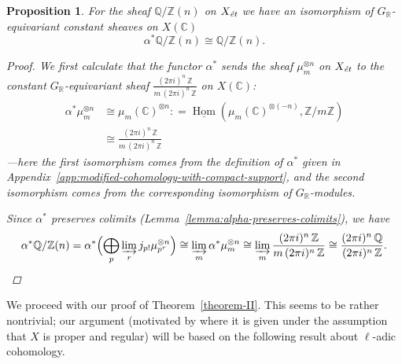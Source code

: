 \documentclass[leqno,12pt]{article}
\theoremstyle{plain}
\newtheorem{proposition}[theorem]{\indent\sc Proposition}
\theoremstyle{definition}
\DeclareMathOperator{\Hom}{Hom}
\newcommand{\CC}{\mathbb{C}}
\newcommand{\QQ}{\mathbb{Q}}
\newcommand{\RR}{\mathbb{R}}
\newcommand{\ZZ}{\mathbb{Z}}
\newcommand{\dfn}{\mathrel{\mathop:}=}
\newcommand{\et}{\text{\it \'{e}t}}
\newcommand{\iHom}{\underline{\Hom}}
\begin{document}
\begin{proposition}
  \label{propn:image-of-Q/Zn-under-alpha}
  For the sheaf $\QQ/\ZZ (n)$ on $X_\et$ we have an isomorphism of
  $G_\RR$-equivariant constant sheaves on $X (\CC)$
  $$\alpha^* \QQ/\ZZ (n) \cong \QQ/\ZZ (n).$$

  \begin{proof}
    We first calculate that the functor $\alpha^*$ sends the sheaf
    $\mu_m^{\otimes n}$ on $X_\et$ to the constant $G_\RR$-equivariant sheaf
    $\frac{(2\pi i)^n\,\ZZ}{m\,(2\pi i)^n\,\ZZ}$ on $X(\CC)$:
    \begin{align*}
      \alpha^* \mu_m^{\otimes n} & \cong \mu_m (\CC)^{\otimes n} \dfn \iHom (\mu_m (\CC)^{\otimes (-n)}, \ZZ/m\ZZ) \\
                                 & \cong \frac{(2\pi i)^n\,\ZZ}{m\,(2\pi i)^n\,\ZZ}
    \end{align*}
    ---here the first isomorphism comes from the definition of $\alpha^*$ given
    in Appendix~\ref{app:modified-cohomology-with-compact-support}, and the
    second isomorphism comes from the corresponding isomorphism of
    $G_\RR$-modules.

    Since $\alpha^*$ preserves colimits
    (Lemma~\ref{lemma:alpha-preserves-colimits}), we have
    \[
      \alpha^* \QQ/\ZZ (n)
      = \alpha^* \Bigl(\bigoplus_p \varinjlim_r j_{p!} \mu_{p^r}^{\otimes n}\Bigr)
      \cong \varinjlim_m \alpha^* \mu_m^{\otimes n}
      \cong \varinjlim_m \frac{(2\pi i)^n\,\ZZ}{m\,(2\pi i)^n\,\ZZ}
      \cong \frac{(2\pi i)^n\,\QQ}{(2\pi i)^n\,\ZZ}.
      \qedhere
    \]
  \end{proof}
\end{proposition}

We proceed with our proof of Theorem~\ref{theorem-II}. This seems to be rather
nontrivial; our argument (motivated by \cite{Flach-Morin-2018} where it is given
under the assumption that $X$ is proper and regular) will be based on the
following result about $\ell$-adic cohomology.
\end{document}

